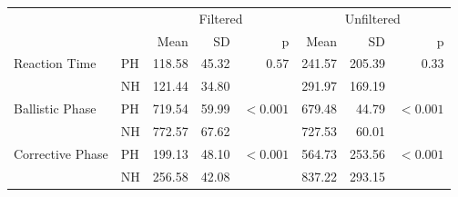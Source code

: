 \begin{tabular}{llrrrrrr}
\toprule
                 &    & \multicolumn{3}{c}{Filtered} & \multicolumn{3}{c}{Unfiltered} \\
                 &    & Mean & SD & p         & Mean & SD & p \\
\midrule
\multirow{2}{*}{Reaction Time} & PH & 118.58 & 45.32 & \multirow{2}{*}{$0.57$} & 241.57 & 205.39 & \multirow{2}{*}{$0.33$}  \\
                               & NH & 121.44 & 34.80 &                         & 291.97 & 169.19 & \\
\midrule
\multirow{2}{*}{Ballistic Phase} & PH & 719.54 & 59.99 & \multirow{2}{*}{$<0.001$} & 679.48 & 44.79 & \multirow{2}{*}{$<0.001$} \\
                                 & NH & 772.57 & 67.62 &                           & 727.53 & 60.01 & \\
\midrule
\multirow{2}{*}{Corrective Phase} & PH & 199.13 & 48.10 & \multirow{2}{*}{$<0.001$} & 564.73 & 253.56 & \multirow{2}{*}{$<0.001$} \\
                                  & NH & 256.58 & 42.08 &                           & 837.22 & 293.15 & \\
\bottomrule
\end{tabular}
